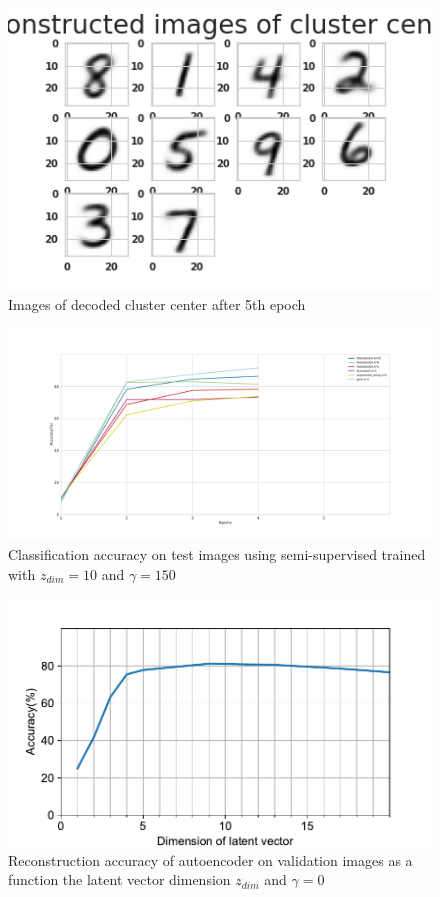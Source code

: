 \documentclass{uai2021} %
\begin{document}
\begin{figure}[]
\centering
\includegraphics[width=\linewidth]{cluster_centers_epoch_5.0_gmm}
\caption{Images of decoded cluster center after 5th epoch}
\label{cluster_center_6_gmm}
\end{figure}

\begin{figure}[]
\centering
\includegraphics[width=\linewidth]{classification_accuracy_comparison}
\caption{Classification accuracy on test images using semi-supervised trained with $z_{dim}=10$ and $\gamma = 150$}
\label{classification_accuracy_comparison}
\end{figure}

\begin{figure}[]
\centering
\includegraphics[width=\linewidth]{reconstruction_accuracy}
\caption{Reconstruction accuracy of autoencoder on validation images as a function the latent vector dimension  $z_{dim}$ and $\gamma = 0$}
\label{reconstruction_accuracy}
\end{figure}
\end{document}
